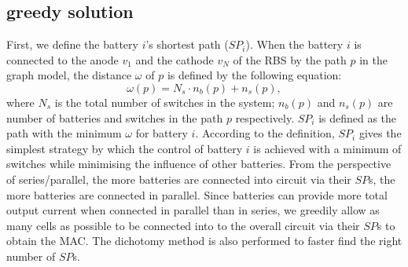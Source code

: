\documentclass{article}
\begin{document}
\subsection{greedy solution}
First, we define the battery $i$'s shortest path ($SP_i$).
When the battery $i$ is connected to the anode $v_1$ and the cathode $v_N$ of the RBS by the path $p$ in the graph model, the distance $\omega$ of $p$ is defined by the following equation:
\begin{equation}\label{eq:weight}
    \omega(p) = N_s \cdot n_b (p) + n_s (p),
\end{equation}
where $N_s$ is the total number of switches in the system; $n_b(p)$ and $n_s(p)$ are number of batteries and switches in the path $p$ respectively.
$SP_i$ is defined as the path with the minimum $\omega$ for battery $i$.
According to the definition, $SP_i$ gives the simplest strategy by which the control of battery $i$ is achieved with a minimum of switches while minimising the influence of other batteries.
From the perspective of series/parallel, the more batteries are connected into circuit via their $SP$s, the more batteries are connected in parallel.
Since batteries can provide more total output current when connected in parallel than in series, we greedily allow as many cells as possible to be connected into to the overall circuit via their $SP$s to obtain the MAC.
The dichotomy method is also performed to faster find the right number of $SP$s.
\end{document}
